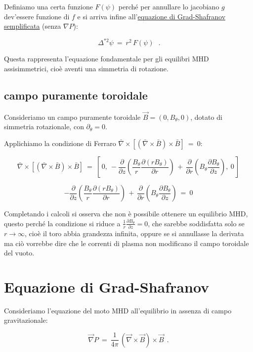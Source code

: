 Definiamo una certa funzione $F(\psi)$ perché per annullare lo jacobiano $g$ dev'essere funzione di $f$ e si arriva infine all'\underline{equazione di Grad-Shafranov semplificata} (senza $\nabla P$):

\begin{equation}
\label{Grad-Shafranov sempl}
\boxed{\ \Delta^{*2} \psi\ =\ r^2\, F(\psi)\ }\ \ .
\end{equation}

Questa rappresenta l'equazione fondamentale per gli equilibri MHD assisimmetrici, cioè aventi una simmetria di rotazione.


%
%
%
\subsection{campo puramente toroidale}

Consideriamo un campo puramente toroidale $\vec B = (0, B_\theta, 0)$, dotato di simmetria rotazionale, con $\partial_\theta =0$. 

Applichiamo la condizione di Ferraro $\bar \nabla \times [(\bar \nabla \times \bar B)\times \bar B]\ =\ 0$:

\[
\bar \nabla \times [(\bar \nabla \times \bar B)\times \bar B]\ =\ 
[\,0,\ -\frac{\partial}{\partial z}\left(\frac{B_\theta}{r}\frac{\partial (rB_\theta)}{\partial r}\right)\, +\, \frac{\partial}{\partial r}\left(B_\theta \frac{\partial B_\theta}{\partial z}\right),\ 0\, ]
\]

\[
-\frac{\partial}{\partial z}\left(\frac{B_\theta}{r}\frac{\partial (rB_\theta)}{\partial r}\right)\, +\, \frac{\partial}{\partial r}\left(B_\theta \frac{\partial B_\theta}{\partial z}\right)\ =\ 0
\]

Completando i calcoli si osserva che non è possibile ottenere un equilibrio MHD, questo perché la condizione si riduce a $\frac{1}{r} \frac{\partial B_\theta}{\partial z} = 0$, che sarebbe soddisfatta solo se $r\rightarrow\infty$, cioè il toro abbia grandezza infinita, oppure se si annullasse la derivata ma ciò vorrebbe dire che le correnti di plasma non modificano il campo toroidale del vuoto.


%
%
%
\section{Equazione di Grad-Shafranov}

Consideriamo l'equazione del moto MHD all'equilibrio in assenza di campo gravitazionale: 

\[\vec \nabla P\ =\ \frac{1}{4\pi}\, (\vec \nabla \times \vec B)\times \vec B\ \ .\] 

